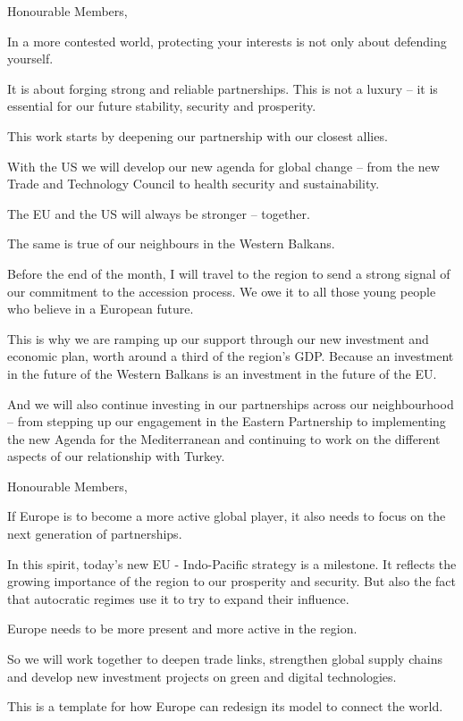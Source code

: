 \documentclass[a4paper,11pt]{article}
\begin{document}
 

Honourable Members,

In a more contested world, protecting your interests is not only about defending yourself.

It is about forging strong and reliable partnerships. This is not a luxury – it is essential for our future stability, security and prosperity.

This work starts by deepening our partnership with our closest allies.

With the US we will develop our new agenda for global change – from the new Trade and Technology Council to health security and sustainability. 

The EU and the US will always be stronger – together.

The same is true of our neighbours in the Western Balkans.

Before the end of the month, I will travel to the region to send a strong signal of our commitment to the accession process. We owe it to all those young people who believe in a European future.

This is why we are ramping up our support through our new investment and economic plan, worth around a third of the region's GDP. Because an investment in the future of the Western Balkans is an investment in the future of the EU.

And we will also continue investing in our partnerships across our neighbourhood – from stepping up our engagement in the Eastern Partnership to implementing the new Agenda for the Mediterranean and continuing to work on the different aspects of our relationship with Turkey.

 

Honourable Members,

If Europe is to become a more active global player, it also needs to focus on the next generation of partnerships.

In this spirit, today's new EU - Indo-Pacific strategy is a milestone.  It reflects the growing importance of the region to our prosperity and security. But also the fact that autocratic regimes use it to try to expand their influence.  

Europe needs to be more present and more active in the region.

So we will work together to deepen trade links, strengthen global supply chains and develop new investment projects on green and digital technologies. 

This is a template for how Europe can redesign its model to connect the world. 
\end{document}
